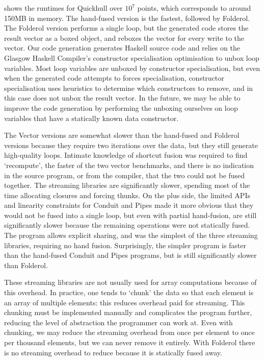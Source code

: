  shows the runtimes for Quickhull over $10^7$ points, which corresponds to around 150MB in memory.
The hand-fused version is the fastest, followed by Folderol.
The Folderol version performs a single loop, but the generated code stores the result vector as a boxed object, and reboxes the vector for every write to the vector.
Our code generation generates Haskell source code and relies on the Glasgow Haskell Compiler's constructor specialisation optimisation \citep{peyton2007call} to unbox loop variables.
Most loop variables are unboxed by constructor specialisation, but even when the generated code attempts to forces specialisation, constructor specialisation uses heuristics to determine which constructors to remove, and in this case does not unbox the result vector.
In the future, we may be able to improve the code generation by performing the unboxing ourselves on loop variables that have a statically known data constructor.

The Vector versions are somewhat slower than the hand-fused and Folderol versions because they require two iterations over the data, but they still generate high-quality loops.
Intimate knowledge of shortcut fusion was required to find `recompute', the faster of the two vector benchmarks, and there is no indication in the source program, or from the compiler, that the two could not be fused together.
The streaming libraries are significantly slower, spending most of the time allocating closures and forcing thunks.
On the plus side, the limited APIs and linearity constraints for Conduit and Pipes made it more obvious that they would not be fused into a single loop, but even with partial hand-fusion, are still significantly slower because the remaining operations were not statically fused.
The \Streaming program allows explicit sharing, and was the simplest of the three streaming libraries, requiring no hand fusion.
Surprisingly, the simpler \Streaming program is faster than the hand-fused Conduit and Pipes programs, but is still significantly slower than Folderol.


These streaming libraries are not usually used for array computations because of this overhead.
In practice, one tends to `chunk' the data so that each element is an array of multiple elements: this reduces overhead paid for streaming.
This chunking must be implemented manually and complicates the program further, reducing the level of abstraction the programmer can work at.
Even with chunking, we may reduce the streaming overhead from once per element to once per thousand elements, but we can never remove it entirely.
With Folderol there is no streaming overhead to reduce because it is statically fused away.


